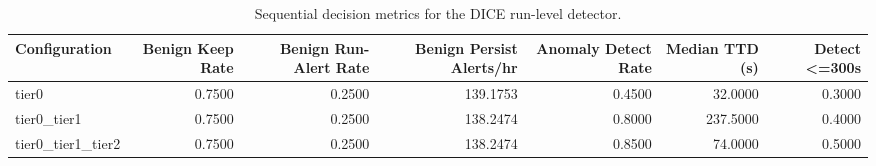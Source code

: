 \begin{table}[t]
\centering
\caption{Sequential decision metrics for the DICE run-level detector.}
\label{tab:dice_sequential_metrics}
\footnotesize
\begin{tabular}{lrrrrrr}
\toprule
Configuration & Benign Keep Rate & Benign Run-Alert Rate & Benign Persist Alerts/hr & Anomaly Detect Rate & Median TTD (s) & Detect <=300s \\
\midrule
tier0 & 0.7500 & 0.2500 & 139.1753 & 0.4500 & 32.0000 & 0.3000 \\
tier0_tier1 & 0.7500 & 0.2500 & 138.2474 & 0.8000 & 237.5000 & 0.4000 \\
tier0_tier1_tier2 & 0.7500 & 0.2500 & 138.2474 & 0.8500 & 74.0000 & 0.5000 \\
\bottomrule
\end{tabular}

\end{table}
